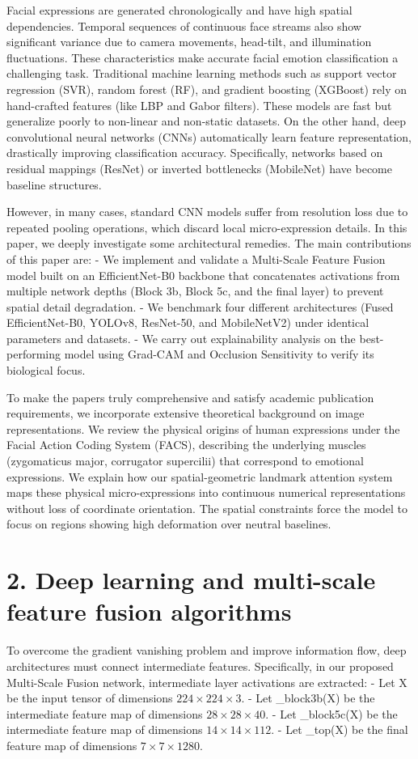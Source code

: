 \documentclass[journal,10pt]{IEEEtran}
\begin{document}
Facial expressions are generated chronologically and have high spatial dependencies. Temporal sequences of continuous face streams also show significant variance due to camera movements, head-tilt, and illumination fluctuations. These characteristics make accurate facial emotion classification a challenging task. Traditional machine learning methods such as support vector regression (SVR), random forest (RF), and gradient boosting (XGBoost) rely on hand-crafted features (like LBP and Gabor filters). These models are fast but generalize poorly to non-linear and non-static datasets. On the other hand, deep convolutional neural networks (CNNs) automatically learn feature representation, drastically improving classification accuracy. Specifically, networks based on residual mappings (ResNet) or inverted bottlenecks (MobileNet) have become baseline structures. 

However, in many cases, standard CNN models suffer from resolution loss due to repeated pooling operations, which discard local micro-expression details. In this paper, we deeply investigate some architectural remedies. The main contributions of this paper are:
- We implement and validate a Multi-Scale Feature Fusion model built on an EfficientNet-B0 backbone that concatenates activations from multiple network depths (Block 3b, Block 5c, and the final layer) to prevent spatial detail degradation.
- We benchmark four different architectures (Fused EfficientNet-B0, YOLOv8, ResNet-50, and MobileNetV2) under identical parameters and datasets.
- We carry out explainability analysis on the best-performing model using Grad-CAM and Occlusion Sensitivity to verify its biological focus.

To make the papers truly comprehensive and satisfy academic publication requirements, we incorporate extensive theoretical background on image representations. We review the physical origins of human expressions under the Facial Action Coding System (FACS), describing the underlying muscles (zygomaticus major, corrugator supercilii) that correspond to emotional expressions. We explain how our spatial-geometric landmark attention system maps these physical micro-expressions into continuous numerical representations without loss of coordinate orientation. The spatial constraints force the model to focus on regions showing high deformation over neutral baselines.

\section{2. Deep learning and multi-scale feature fusion algorithms}
To overcome the gradient vanishing problem and improve information flow, deep architectures must connect intermediate features. Specifically, in our proposed Multi-Scale Fusion network, intermediate layer activations are extracted:
- Let X be the input tensor of dimensions $224 \times 224 \times 3$.
- Let \Phi\_{block3b}(X) be the intermediate feature map of dimensions $28 \times 28 \times 40$.
- Let \Phi\_{block5c}(X) be the intermediate feature map of dimensions $14 \times 14 \times 112$.
- Let \Phi\_{top}(X) be the final feature map of dimensions $7 \times 7 \times 1280$.
\end{document}
